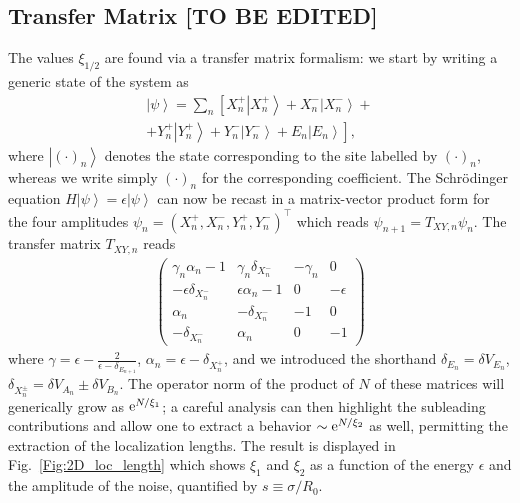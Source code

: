 \documentclass[prl,aps,twocolumn,showpacs,superscriptaddress,longbibliography]{revtex4-1}
\newcommand{\be}{\begin{equation}}
\newcommand{\ee}{\end{equation}}
\newcommand{\rme}[1]{{\rm{e}}^{#1}}
\newcommand{\lqq}{\left[}
\newcommand{\rqq}{\right]}
\newcommand{\ran}{\right\rangle}
\newcommand{\ket}[1]{\left| #1 \ran}
\begin{document}
\subsection{Transfer Matrix [TO BE EDITED]}

The values $\xi_{1/2}$ are found via a transfer matrix formalism: we start by writing a generic state of the system as 
\be
\begin{split}
	\ket{\psi} = \sum_n \lqq  X_n^+ \ket{X_n^+} + X_n^- \ket{X_n^-} + \right. \\
	\left. + Y_n^+ \ket{Y_n^+} + Y_n^- \ket{Y_n^-} + E_n \ket{E_n}    \rqq,
\end{split}
\ee
where $\ket{(\cdot)_n}$ denotes the state corresponding to the site labelled by $(\cdot)_n$, whereas we write simply $(\cdot)_n$ for the corresponding coefficient. The Schr\"odinger equation $H \ket{\psi} = \epsilon \ket{\psi}$ can now be recast in a matrix-vector product form for the four amplitudes $\psi_n = (X_n^+, X_n^-, Y_n^+, Y_n^-)^\intercal$ \cite{SM} which reads $\psi_{n+1} = T_{XY,n} \psi_n$. The transfer matrix $T_{XY,n}$ reads
%
  \begin{align}
    \begin{pmatrix} 
	\gamma_n \alpha_n  -1        &   \gamma_n \delta_{X^-_n}                & -\gamma_n         & 0 \\
	  -\epsilon \delta_{X^-_n}          & \epsilon \alpha_n  -1              & 0      & -\epsilon \\
	  \alpha_n                                & -\delta_{X^-_n}                                          & -1              & 0\\
	    -\delta_{X^-_n}                                 &  \alpha_n                                        &  0              & -1        
  \end{pmatrix}
  \label{Eq:Transfer_Matrix}
  \end{align}
 where $\gamma = \epsilon - \tfrac{2}{\epsilon-\delta_{E_{n+1}}}$, $\alpha_n = \epsilon - \delta_{X^+_n}$, and we introduced the shorthand $\delta_{E_n} = \delta V_{E_n}$, $\delta_{X_n^\pm} = \delta V_{A_n} \pm \delta V_{B_n}$. The operator norm of the product of $N$ of these matrices will generically grow as $\rme{N / \xi_1}$; a careful analysis can then highlight the subleading contributions \cite{a_Dwivedi_PRB_93} and allow one to extract a behavior $\sim \rme{N / \xi_2}$ as well, permitting the extraction of the localization lengths. The result is displayed in Fig.~\ref{Fig:2D_loc_length} which shows $\xi_1$ and $\xi_2$ as a function of the energy $\epsilon$ and the amplitude of the noise, quantified by $s \equiv \sigma / R_0$. 





\end{document}
